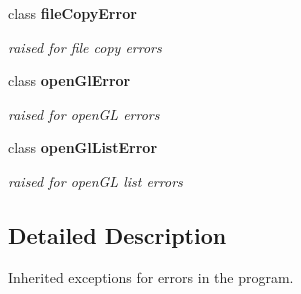 \begin{DoxyCompactItemize}
class {\bf file\-Copy\-Error}
\begin{DoxyCompactList}\small\item\em raised for file copy errors \end{DoxyCompactList}\item 
class {\bf open\-Gl\-Error}
\begin{DoxyCompactList}\small\item\em raised for open\-G\-L errors \end{DoxyCompactList}\item 
class {\bf open\-Gl\-List\-Error}
\begin{DoxyCompactList}\small\item\em raised for open\-G\-L list errors \end{DoxyCompactList}\end{DoxyCompactItemize}


\subsection{Detailed Description}
Inherited exceptions for errors in the program. 